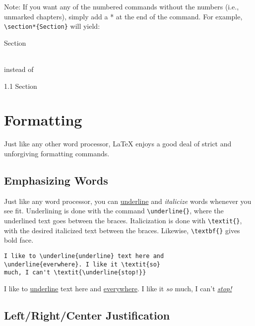 Note: If you want any of the numbered commands without the numbers
(i.e., unmarked chapters), simply add a * at the end of the command.
For example, \verb=\section*{Section}= will yield: \\[0.25cm]
\begin{Large}
  Section
\end{Large} \\[0.25cm]
\noindent instead of \\[0.25cm]
\begin{Large}
  1.1 \quad Section
\end{Large}

\section{Formatting}
\label{sec:formatting}

Just like any other word processor, \LaTeX{} enjoys a good deal of
strict and unforgiving formatting commands.

\subsection{Emphasizing Words}
\label{sec:emphasizing-words}

Just like any word processor, you can \underline{underline} and
\textit{italicize} words whenever you see fit.  Underlining is done
with the command \verb=\underline{}=, where the underlined text
goes between the braces.  Italicization is done with
\verb=\textit{}=, with the desired italicized text between the
braces.  Likewise, \verb=\textbf{}= gives bold face.
\begin{framed}
\begin{verbatim}
I like to \underline{underline} text here and
\underline{everwhere}. I like it \textit{so}
much, I can't \textit{\underline{stop!}}
\end{verbatim}
  I like to \underline{underline} text here and
  \underline{everywhere}.  I like it \textit{so} much, I can't
  \textit{\underline{stop!}}
\end{framed}

\subsection{Left/Right/Center Justification}
\label{sec:leftr-just}

